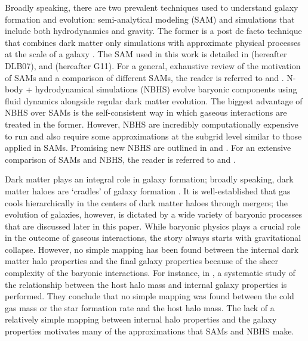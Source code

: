 \documentclass[a4paper,fleqn,usenatbib]{mnras}
\begin{document}
\par Broadly speaking, there are two prevalent techniques used to understand galaxy formation and evolution: semi-analytical modeling (SAM) and simulations that include both  hydrodynamics and gravity. The former is a post de facto technique that combines dark matter only simulations with approximate physical processes at the scale of a galaxy \citep{baugh2006primer}. The SAM used in this work is detailed in \citet{croton2006many, de2006formation, de2007hierarchical} (hereafter DLB07), and \citet{guo2011dwarf} (hereafter G11). For a general, exhaustive review of the motivation of SAMs and a comparison of different SAMs, the reader is referred to \citet{baugh2006primer, somerville2014physical} and \citet{knebe2015nifty}. N-body + hydrodynamical simulations (NBHS) evolve baryonic components using fluid dynamics alongside regular dark matter evolution. The biggest advantage of NBHS over SAMs is the self-consistent way in which gaseous interactions are treated in the former. However, NBHS are incredibly computationally expensive to run and also require some approximations at the subgrid level similar to those applied in SAMs. Promising new NBHS are outlined in \citet{vogelsberger2014introducing} and \citet{schaye2015eagle}. For an extensive comparison of SAMs and NBHS, the reader is referred to \citet{benson2001comparison, yoshida2002gas}  and \citet{somerville2014physical}.

\par
Dark matter plays an integral role in galaxy formation; broadly speaking, dark matter haloes are `cradles' of galaxy formation \citep{baugh2006primer}. It is well-established that gas cools hierarchically in the centers of dark matter haloes through mergers; the evolution of galaxies, however, is dictated by a wide variety of baryonic processes that are discussed later in this paper. While baryonic physics plays a crucial role in the outcome of gaseous interactions, the story always starts with gravitational collapse. However, no simple mapping has been found between the internal dark matter halo properties and the final galaxy properties because of the sheer complexity of the baryonic interactions. For instance, in \citet{contreras2015galaxy}, a systematic study of the relationship between the host halo mass and internal galaxy properties is performed. They conclude that no simple mapping was found between the cold gas mass or the star formation rate and the host halo mass. The lack of a relatively simple mapping between internal halo properties and the galaxy properties motivates many of the approximations that SAMs and NBHS make. 
\end{document}
